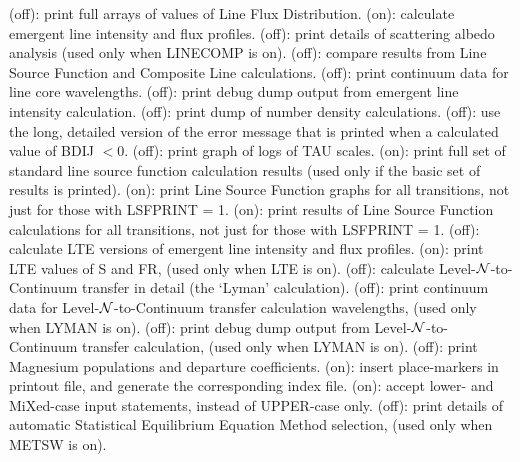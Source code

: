 \space \vbox { (off): \bang
print full arrays of values of Line Flux Distribution.}
\space \vbox { (on): \bang
calculate emergent line intensity and flux profiles.}
\space \vbox { (off): \bang
print details of scattering albedo analysis (used only when LINECOMP is on).}
\space \vbox { (off): \bang
compare results from Line Source Function and Composite Line calculations.}
\space \vbox { (off): \bang
print continuum data for line core wavelengths.}
\space \vbox { (off): \bang
print debug dump output from emergent line intensity calculation.}
\space \vbox { (off): \bang
print dump of number density calculations.}
\space \vbox { (off): \bang
use the long, detailed version of the error message that is printed when
a calculated value of BDIJ $ < 0$.}
\space \vbox { (off): \bang
print graph of logs of TAU scales.}
\space \vbox { (on): \bang
print full set of standard line source function calculation results
(used only if the basic set of results is printed).}
\space \vbox { (on): \bang
print Line Source Function graphs for all transitions, not just
for those with LSFPRINT = 1.}
\space \vbox { (on): \bang
print results of Line Source Function calculations for all transitions,
not just for those with LSFPRINT = 1.}
\space \vbox { (off): \bang
calculate LTE versions of emergent line intensity and flux profiles.}
\space \vbox { (on): \bang
print LTE values of S and FR, (used only when LTE is on).}
\space \vbox { (off): \bang
calculate Level-${\cal N}$-to-Continuum transfer in detail (the `Lyman'
calculation).}
\space \vbox { (off): \bang
print continuum data for Level-${\cal N}$-to-Continuum transfer calculation
wavelengths, (used only when LYMAN is on).}
\space \vbox { (off): \bang
print debug dump output from Level-${\cal N}$-to-Continuum transfer
calculation, (used only when LYMAN is on).}
\space \vbox { (off): \bang
print Magnesium populations and departure coefficients.}
\space \vbox { (on): \bang
insert place-markers in printout file, and generate the corresponding
index file.}
\space \vbox { (on): \bang
accept lower- and MiXed-case input statements, instead of UPPER-case only.}
\space \vbox { (off): \bang
print details of automatic Statistical Equilibrium Equation Method selection,
(used only when METSW is on).}

